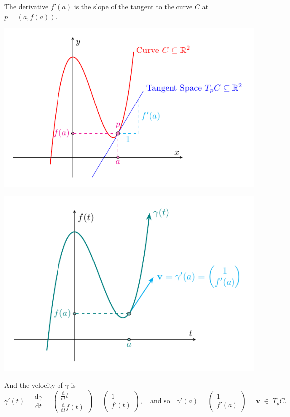 \documentclass[11pt,openany]{article}
\renewcommand{\vec}[1]{\mathbf{#1}}
\begin{document}
\newpage
The derivative \(f'(a)
\) 
is the slope of the tangent to the curve \(C\) at \(p = (a, f(a))\).
\begin{center}
\begin{minipage}{.49\textwidth}
\includegraphics[scale=1]{tangent-space-2.pdf}
\end{minipage}\hfill
\begin{minipage}{.49\textwidth}
\includegraphics[scale=1]{tangent-space-3-1.pdf}
\end{minipage}
\end{center}
And the velocity of $\gamma$ is \[
\gamma'(t)=\frac{\mathrm{d}\gamma}{\mathrm{d}t}
=\begin{pmatrix}
\frac{\mathrm{d}}{\mathrm{d}t}t\\
\frac{\mathrm{d}}{\mathrm{d}t}f(t)
\end{pmatrix}
=\begin{pmatrix}
1\\ f'(t)\end{pmatrix},
\quad\text{and so}\quad
\gamma'(a)=\begin{pmatrix}
	1\\ f'(a)\end{pmatrix}=\vec{v}\;\in\;T_pC.
\]
\end{document}
